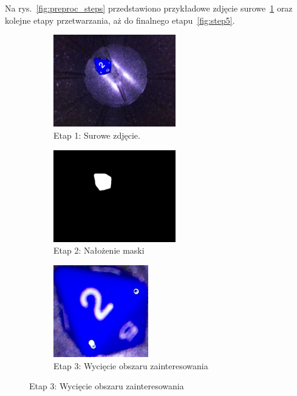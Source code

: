 Na rys.~\ref{fig:preproc_steps} przedstawiono przykładowe zdjęcie surowe~\ref{fig:step1}
oraz kolejne etapy przetwarzania, aż do finalnego etapu~\ref{fig:step5}.

\begin{figure}[H]
    \centering
    \begin{subfigure}[t]{0.32\linewidth}
        \centering
        \includegraphics[height=4cm]{chapters/04-czytanie/figures/2_1}
        \caption{Etap 1: Surowe zdjęcie.}
        \label{fig:step1}
    \end{subfigure}
    \hspace{-0.5em}
    \begin{subfigure}[t]{0.32\linewidth}
        \centering
        \includegraphics[height=4cm]{chapters/04-czytanie/figures/2_2}
        \caption{Etap 2: Nałożenie maski}
        \label{fig:step2}
    \end{subfigure}
    \hspace{-0.5em}
    \begin{subfigure}[t]{0.32\linewidth}
        \centering
        \includegraphics[height=4cm]{chapters/04-czytanie/figures/2_3}
        \caption{Etap 3: Wycięcie obszaru zainteresowania}
        \label{fig:step3}
    \end{subfigure}


\end{figure}
